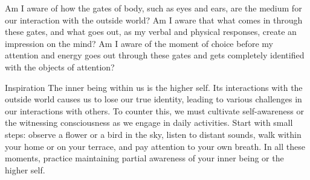 \begin{mananam}{} 
\mananamtext Am I aware of how the gates of body, such as eyes and ears, are the medium for our interaction with the outside world? Am I aware that what comes in through these gates, and what goes out, as my verbal and physical responses, create an impression on the mind? Am I aware of the moment of choice before my attention and energy goes out through these gates and gets completely identified with the objects of attention?
\end{mananam}
\WritingHand{}
\begin{inspiration}{\mananamfont Inspiration}
\mananamtext The inner being within us is the higher self. Its interactions with the outside world causes us to lose our true identity, leading to various challenges in our interactions with others. To counter this, we must cultivate self-awareness or the witnessing consciousness as we engage in daily activities. Start with small steps: observe a flower or a bird in the sky, listen to distant sounds, walk within your home or on your terrace, and pay attention to your own breath. In all these moments, practice maintaining partial awareness of your inner being or the higher self.
\end{inspiration}
\newpage



